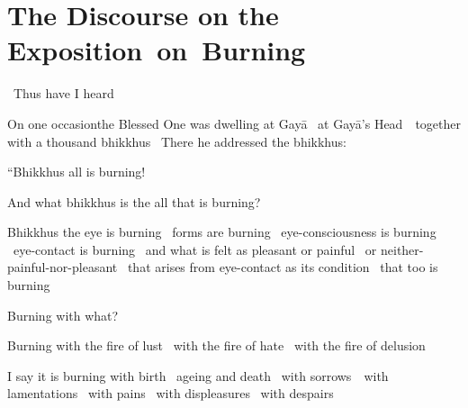 
\section{The Discourse on the \mbox{Exposition}~on~Burning}
\label{exposition-on-burning}

\begin{leader-english}
  \anglebracketleft\ \hspace{-0.5mm}Thus have I heard \hspace{-0.5mm}\anglebracketright\
\end{leader-english}

\begin{english-only-hang}
  On one occasion\makeatletter\hyperlink{endnote113-appendix}\makeatother\thinspace the Blessed One was dwelling at Gayā \breathmark\ at Gayā's \mbox{Head}~\breathmark\ together with a thousand bhikkhus \breathmark\ There he addressed the bhikkhus:
\end{english-only-hang}

\begin{english-only-hang}
  ``Bhikkhus all is burning!
\end{english-only-hang}

\begin{english-only-hang}
  And what bhikkhus is the all that is burning?
\end{english-only-hang}

\begin{english-only-hang}
  Bhikkhus the eye is burning \breathmark\ forms are burning \breathmark\ eye-consciousness is burning \breathmark\ eye-contact is burning \breathmark\ and what is felt as pleasant or painful \breathmark\ or neither-painful-nor-pleasant \breathmark\ that arises from eye-contact as its condition \breathmark\ that too is burning
\end{english-only-hang}
\begin{english-only-hang-together}
  Burning with what?
\end{english-only-hang-together}
\begin{english-only-hang-together}
  Burning with the fire of lust \breathmark\ with the fire of hate \breathmark\ with the fire of delusion
\end{english-only-hang-together}
\begin{english-only-hang-together}
  I say it is burning with birth \breathmark\ ageing and death \breathmark\ with \mbox{sorrows}~\breathmark\ with lamentations \breathmark\ with pains \breathmark\ with displeasures \breathmark\ with despairs
\end{english-only-hang-together}

